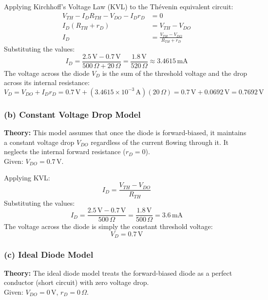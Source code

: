 \documentclass[12pt,a3paper]{article}
\begin{document}
\begin{enumerate}
\begin{tcolorbox}[enhanced,breakable,ansbox,colback=cA!4,colframe=cA,boxrule=0.8pt,arc=5pt,title={\textbf{Answer}},fonttitle=\bfseries\color{white},colbacktitle=cA]
Applying Kirchhoff's Voltage Law (KVL) to the Th\'evenin equivalent circuit:
\begin{align}
    V_{TH} - I_D R_{TH} - V_{DO} - I_D r_D &= 0 \\
    I_D (R_{TH} + r_D) &= V_{TH} - V_{DO} \\
    I_D &= \frac{V_{TH} - V_{DO}}{R_{TH} + r_D}
\end{align}
Substituting the values:
\begin{equation}
    I_D = \frac{2.5\,\text{V} - 0.7\,\text{V}}{500\,\Omega + 20\,\Omega} = \frac{1.8\,\text{V}}{520\,\Omega} \approx 3.4615\,\text{mA}
\end{equation}
The voltage across the diode $V_D$ is the sum of the threshold voltage and the drop across its internal resistance:
\begin{equation}
    V_D = V_{DO} + I_D r_D = 0.7\,\text{V} + (3.4615 \times 10^{-3}\,\text{A})(20\,\Omega) = 0.7\,\text{V} + 0.0692\,\text{V} = 0.7692\,\text{V}
\end{equation}

\subsubsection*{(b) Constant Voltage Drop Model}
\textbf{Theory:} This model assumes that once the diode is forward-biased, it maintains a constant voltage drop $V_{DO}$ regardless of the current flowing through it. It neglects the internal forward resistance ($r_D = 0$). \\
Given: $V_{DO} = 0.7\,\text{V}$.

Applying KVL:
\begin{equation}
    I_D = \frac{V_{TH} - V_{DO}}{R_{TH}}
\end{equation}
Substituting the values:
\begin{equation}
    I_D = \frac{2.5\,\text{V} - 0.7\,\text{V}}{500\,\Omega} = \frac{1.8\,\text{V}}{500\,\Omega} = 3.6\,\text{mA}
\end{equation}
The voltage across the diode is simply the constant threshold voltage:
\begin{equation}
    V_D = 0.7\,\text{V}
\end{equation}

\subsubsection*{(c) Ideal Diode Model}
\textbf{Theory:} The ideal diode model treats the forward-biased diode as a perfect conductor (short circuit) with zero voltage drop. \\
Given: $V_{DO} = 0\,\text{V}$, $r_D = 0\,\Omega$.


\end{tcolorbox}
\end{enumerate}
\end{document}
